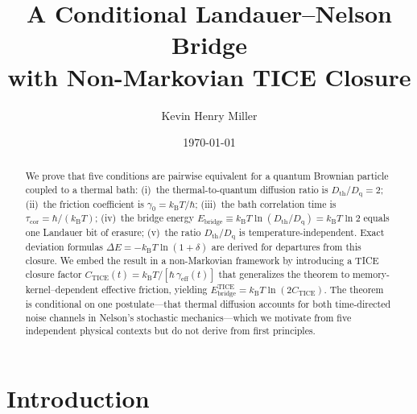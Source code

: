 \documentclass[twocolumn,showpacs,preprintnumbers,amsmath,amssymb]{revtex4-2}
\newcommand{\kB}{k_{\mathrm{B}}}
\newcommand{\Dth}{D_{\mathrm{th}}}
\newcommand{\Dq}{D_{\mathrm{q}}}
\newcommand{\geff}{\gamma_{\mathrm{eff}}}
\newcommand{\tcor}{\tau_{\mathrm{cor}}}
\newcommand{\Ebr}{E_{\mathrm{bridge}}}
\newcommand{\CTICE}{C_{\mathrm{TICE}}}
\begin{document}

\title{A Conditional Landauer--Nelson Bridge\\
with Non-Markovian TICE Closure}

\author{Kevin Henry Miller}
\noaffiliation

\date{\today}

\begin{abstract}
We prove that five conditions are pairwise equivalent for a
quantum Brownian particle coupled to a thermal bath:
(i)~the thermal-to-quantum diffusion ratio is $\Dth/\Dq = 2$;
(ii)~the friction coefficient is $\gamma_0 = \kB T/\hbar$;
(iii)~the bath correlation time is $\tcor = \hbar/(\kB T)$;
(iv)~the bridge energy
$\Ebr \equiv \kB T \ln(\Dth/\Dq) = \kB T \ln 2$
equals one Landauer bit of erasure;
(v)~the ratio $\Dth/\Dq$ is temperature-independent.
Exact deviation formulas
$\Delta E = -\kB T\ln(1+\delta)$ are derived for departures
from this closure.
We embed the result in a non-Markovian framework by introducing
a TICE closure factor $\CTICE(t) = \kB T/[\hbar\,\geff(t)]$
that generalizes the theorem to memory-kernel--dependent
effective friction, yielding
$\Ebr^{\mathrm{TICE}} = \kB T\ln(2\CTICE)$.
The theorem is conditional on one postulate---that thermal
diffusion accounts for both time-directed noise channels in
Nelson's stochastic mechanics---which we motivate from five
independent physical contexts but do not derive from first
principles.
\end{abstract}

\maketitle

\section{Introduction}
\end{document}
